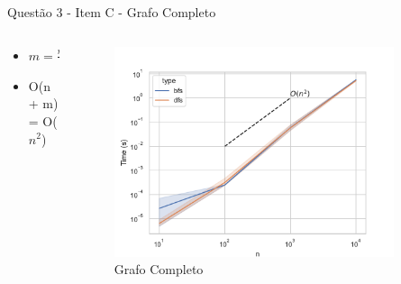 \documentclass[aspectratio=169,usenames,dvipsnames]{beamer}
\begin{document}
\begin{frame}{ Questão 3 - Item C - Grafo Completo }
  \begin{columns}
    \begin{column}{0.5\textwidth}
      \begin{itemize}
        \item $m = \frac{n(n-1)}{2}$
        \item O(n + m) = O($n ^ 2$)
      \end{itemize}
    \end{column}
    \begin{column}{0.5\textwidth}
      \begin{figure}
        \includegraphics[width=0.9\textwidth]{figs/time_complete_graph.pdf}
        \caption{Grafo Completo}
      \end{figure}
    \end{column}
  \end{columns}
\end{frame}
\end{document}

